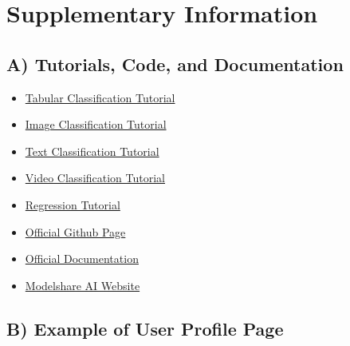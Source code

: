 \section{Supplementary Information}
\appendix

\subsection{A) Tutorials, Code, and Documentation}
\label{app:tutorials}

\begin{itemize}


\item 
\href{https://colab.research.google.com/github/AIModelShare/aimodelshare_tutorials/blob/main/modelshareai/QST_Tabular_Classification.ipynb}{Tabular Classification Tutorial}

\item 
\href{https://colab.research.google.com/github/AIModelShare/aimodelshare_tutorials/blob/main/modelshareai/Keras_Image_Classification_Quick_Start_Tutorial.ipynb}{Image Classification Tutorial}

\item 
\href{https://colab.research.google.com/github/AIModelShare/aimodelshare_tutorials/blob/main/modelshareai/Text_Classification_QuickStart_IMDB.ipynb}{Text Classification Tutorial}

\item 
\href{https://colab.research.google.com/github/AIModelShare/aimodelshare_tutorials/blob/main/modelshareai/Keras_Video_Classification_Quick_Start_Tutorial(1).ipynb}{Video Classification Tutorial}

\item 
\href{https://www.modelshare.ai/notebooks/notebook:229}{Regression Tutorial}

\item 
\href{https://github.com/AIModelShare/aimodelshare}{Official Github Page}

\item 
\href{https://aimodelshare.readthedocs.io/en/latest/index.html}{Official Documentation}

\item 
\href{https://www.modelshare.ai/}{Modelshare AI Website}


\end{itemize}

\newpage
\subsection{B) Example of User Profile Page}
\label{app:profile_page}

